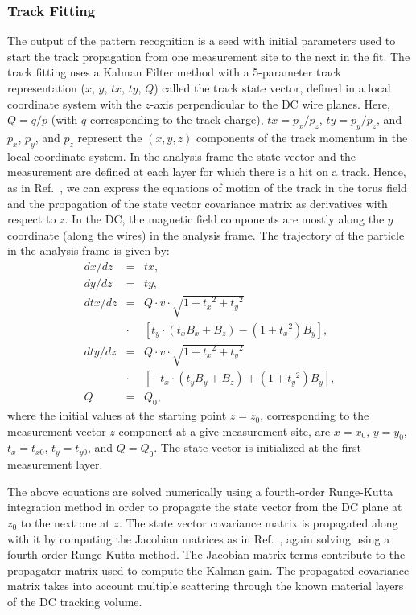 \subsubsection{Track Fitting}
\label{sec-trackfitting}

The output of the pattern recognition is a seed with initial parameters used to start the track propagation from one
measurement site to the next in the fit. The track fitting uses a Kalman Filter method with a 5-parameter track
representation ($x$, $y$, $tx$, $ty$, $Q$) called the track state vector, defined in a local coordinate system
with the $z$-axis perpendicular to the DC wire planes. Here, $Q=q/p$ (with $q$ corresponding to the track charge),
$tx=p_x/p_z$, $ty=p_y/p_z$, and $p_x$, $p_y$, and $p_z$ represent the $(x,y,z)$ components of the track momentum
in the local coordinate system. In the analysis frame the state vector and the measurement are defined at each layer for
which there is a hit on a track. Hence, as in Ref.~\cite{spiri}, we can express the equations of motion of the track in the
torus field and the propagation of the state vector covariance matrix as derivatives with respect to $z$. In the DC, the
magnetic field components are mostly along the $y$ coordinate (along the wires) in the analysis frame. The trajectory of
the particle in the analysis frame is given by:
\begin{eqnarray}
dx/dz  &=& tx, \nonumber \\
dy/dz  &=&  ty, \nonumber \\
dtx/dz &=& Q \cdot v \cdot \sqrt{1 + {t_x}^2 + {t_y}^2}  \nonumber \\
       &\cdot&\!\!\!\!\! [t_y\cdot (t_x B_x + B_z) - (1 + {t_x}^2 ) B_y],  \nonumber \\
dty/dz  &=&  Q \cdot v \cdot \sqrt{1 + {t_x}^2 + {t_y}^2} \nonumber \\
      &\cdot&\!\!\!\!\! [-t_x\cdot (t_y B_y + B_z) + (1 + {t_y}^2 ) B_y], \nonumber \\
Q  &=&  Q_0,
\end{eqnarray}
\noindent
where the initial values at the starting point $z = z_0$, corresponding to the measurement vector $z$-component at a
give measurement site,  are $x = x_0$, $y = y_0$, $t_x = t_{x0}$, $t_y = t_{y0}$, and $Q = Q_0$.  The state vector is
initialized at the first measurement layer.

The above equations are solved numerically using a fourth-order Runge-Kutta integration method in order to
propagate the state vector from the DC plane at $z_0$ to the next one at $z$.  The state vector covariance
matrix is propagated along with it by computing the Jacobian matrices as in Ref.~\cite{spiri}, again solving using
a fourth-order Runge-Kutta method. The Jacobian matrix terms contribute to the propagator matrix used to
compute the Kalman gain. The propagated covariance matrix takes into account multiple scattering through the
known material layers of the DC tracking volume.

